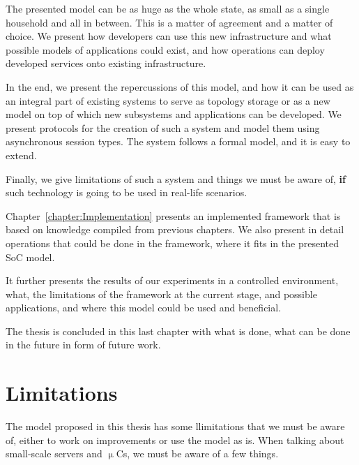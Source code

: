 The presented model can be as huge as the whole state, as small as a single household and all in between. This is a matter of agreement and a matter of choice. We present how developers can use this new infrastructure and what possible models of applications could exist, and how operations can deploy developed services onto existing infrastructure.

In the end, we present the repercussions of this model, and how it can be used as an integral part of existing systems to serve as topology storage or as a new model on top of which new subsystems and applications can be developed. We present protocols for the creation of such a system and model them using asynchronous session types. The system follows a formal model, and it is easy to extend.

Finally, we give limitations of such a system and things we must be aware of, \textbf{if} such technology is going to be used in real-life scenarios.

Chapter~\ref{chapter:Implementation} presents an implemented framework that is based on knowledge compiled from previous chapters. We also present in detail operations that could be done in the framework, where it fits in the presented SoC model.

It further presents the results of our experiments in a controlled environment, what, the limitations of the framework at the current stage, and possible applications, and where this model could be used and beneficial.

The thesis is concluded in this last chapter with what  is done, what can be done in the future in form of future work.
%
%
\section{Limitations}\label{sec:limitations}
%
The model proposed in this thesis has some llimitations that we must be aware of, either to work on improvements or use the model as is. When talking about small-scale servers and $\upmu$Cs, we must be aware of a few things.

